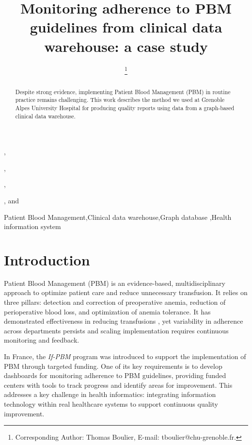\documentclass{IOS-Book-Article}
\def\hb{\hbox to 11.5 cm{}}
\begin{document}
\pagestyle{headings}
\def\thepage{}
\begin{frontmatter}

\title{Monitoring adherence to PBM guidelines from clinical data warehouse: a case study}

\markboth{}{October 2025\hb}

\author[A]{ },
\author[A]{ },
\author[A]{ },
\author[A]{ %
\thanks{Corresponding Author: Thomas Boulier, E-mail: tboulier@chu-grenoble.fr.}}, 
and
\author[A]{ }

\address[A]{Univ. Grenoble Alpes, CNRS, UMR 5525, VetAgro Sup, Grenoble INP, CHU Grenoble Alpes, TIMC, 38000 Grenoble, France}

\begin{abstract}
Despite strong evidence, implementing Patient Blood Management (PBM) in routine practice remains 
challenging. This work describes the method we used at Grenoble Alpes University Hospital for 
producing quality reports using data from a graph-based clinical data warehouse.
\end{abstract}

\begin{keyword}
Patient Blood Management\sep Clinical data warehouse\sep Graph database \sep Health information system
\end{keyword}
\end{frontmatter}

\markboth{October 2025\hb}{October 2025\hb}

\section{Introduction}

Patient Blood Management (PBM) is an evidence-based, multidisciplinary approach to
optimize patient care and reduce unnecessary transfusion. 
It relies on three pillars: detection and correction of preoperative anemia, reduction 
of perioperative blood loss, and optimization of anemia tolerance. 
It has demonstrated effectiveness in reducing 
transfusions \cite{godonReductionRedBlood2024}, yet variability in adherence across 
departments persists and scaling implementation requires continuous monitoring and feedback.

In France, the \textit{If-PBM} program was introduced to support the implementation of PBM 
through targeted funding.  One of its key requirements is to develop dashboards for monitoring 
adherence to PBM guidelines, providing funded centers with tools to track progress and identify areas
for improvement. This addresses a key challenge in health informatics: integrating information 
technology within real healthcare systems to support continuous quality improvement.
\end{document}
